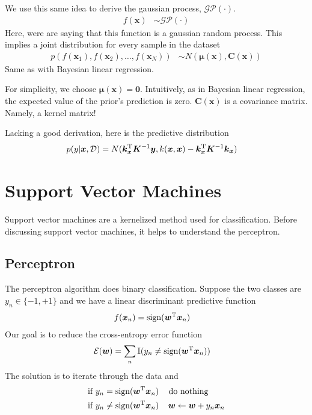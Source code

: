 \documentclass[11pt]{article}
\newcommand{\vct}[1]{\boldsymbol{#1}} %
\newcommand{\mat}[1]{\boldsymbol{#1}} %
\newcommand{\T}{^{\textrm T}} %
\newcommand{\ProbOpr}[1]{\mathbb{#1}}
\begin{document}
We use this same idea to derive the gaussian process, $\mathcal{GP}(\cdot)$.
\begin{align*}
f(\vct{x}) &\sim \mathcal{GP}(\cdot)
\end{align*}
Here, were are saying that this function is a gaussian random process. This implies a joint distribution for every sample in the dataset
\begin{align*}
p(f(\vct{x}_1), f(\vct{x}_2), \hdots, f(\vct{x}_N)) &\sim N(\vct{\mu}(\vct{x}), \mat{C}(\vct{x}))
\end{align*}
Same as with Bayesian linear regression.

For simplicity, we choose $\vct{\mu}(\vct{x}) = \vct{0}$. Intuitively, as in Bayesian linear regression, the expected value of the prior's prediction is zero. $\mat{C}(\vct{x})$ is a covariance matrix. Namely, a kernel matrix!

Lacking a good derivation, here is the predictive distribution
\begin{align*}
p(y|\vct{x}, \mathcal{D}) &= N(\vct{k_x}\T\mat{K}^{-1}\vct{y}, k(\vct{x}, \vct{x}) - \vct{k_x}\T\mat{K}^{-1}\vct{k_x})
\end{align*}

\section{Support Vector Machines}
Support vector machines are a kernelized method used for classification. Before discussing support vector machines, it helps to understand the perceptron.
\subsection{Perceptron}
The perceptron algorithm does binary classification. Suppose the two classes are $y_n \in \{-1, +1\}$ and we have a linear discriminant predictive function
\begin{align*}
f(\vct{x}_n) &= \text{sign}(\vct{w}\T\vct{x}_n)
\end{align*}
Our goal is to reduce the cross-entropy error function
\begin{align*}
\mathcal{E}(\vct{w}) &= \sum_n \ProbOpr{I}(y_n \ne \text{sign}(\vct{w}\T\vct{x}_n))
\end{align*}
The solution is to iterate through the data and
\begin{align*}
\text{if } y_n = \text{sign}(\vct{w}\T\vct{x}_n) & \;\;\;\text{  do nothing}\\
\text{if } y_n \ne \text{sign}(\vct{w}\T\vct{x}_n) &\;\;\;\; \vct{w} \gets \vct{w} + y_n\vct{x}_n
\end{align*}
\end{document}
